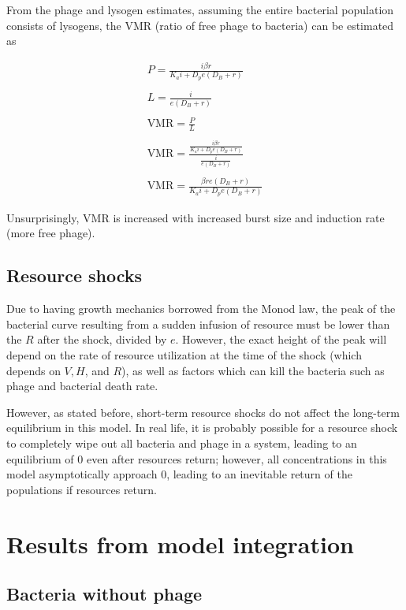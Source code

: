 \documentclass{article}
\begin{document}
From the phage and lysogen estimates, assuming the entire bacterial population consists of lysogens, the VMR (ratio of free phage to bacteria) can be estimated as 
\begin{center}
\begin{align*}
P = \frac{i \beta r }{K_a i + D_p e (D_B+r)} \\ \\
L = \frac{i}{e (D_B + r)} \\ \\
\text{VMR} = \frac{P}{L} \\ \\
\text{VMR} = \frac{\frac{i \beta r }{K_a i + D_p e (D_B+r)}}{\frac{i}{e (D_B + r)}} \\ \\
\text{VMR} = \frac{\beta r e (D_B + r)}{K_a i + D_pe (D_B + r)}
\end{align*}
\end{center}

Unsurprisingly, VMR is increased with increased burst size and induction rate (more free phage).

\subsection{Resource shocks}
Due to having growth mechanics borrowed from the Monod law, the peak of the bacterial curve resulting from a sudden infusion of resource must be lower than the $R$ after the shock, divided by $e$. However, the exact height of the peak will depend on the rate of resource utilization at the time of the shock (which depends on $V, H$, and $R$), as well as factors which can kill the bacteria such as phage and bacterial death rate. 

However, as stated before, short-term resource shocks do not affect the long-term equilibrium in this model. In real life, it is probably possible for a resource shock to completely wipe out all bacteria and phage in a system, leading to an equilibrium of 0 even after resources return; however, all concentrations in this model asymptotically approach 0, leading to an inevitable return of the populations if resources return. 

\section{Results from model integration}
\subsection {Bacteria without phage}
\end{document}
